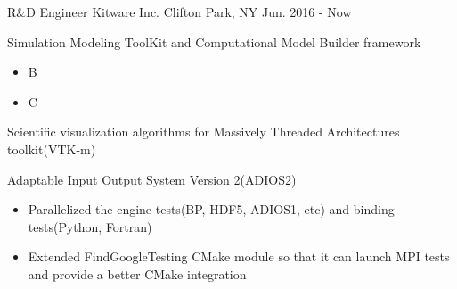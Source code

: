 

\begin{cventries}

  \cventry
    {R\&D Engineer} %
    {Kitware Inc.} %
    {Clifton Park, NY} %
    {Jun. 2016 - Now} %
    {
      \begin{cvitems} %
        \item {Simulation Modeling ToolKit and Computational Model Builder framework}
          \begin{itemize}
              \item {B}
              \item {C}
          \end{itemize}
        \item {Scientific visualization algorithms for Massively Threaded Architectures toolkit(VTK-m)}
        \item {Adaptable Input Output System Version 2(ADIOS2)}
        \begin{itemize}
            \item {Parallelized the engine tests(BP, HDF5, ADIOS1, etc) and binding tests(Python, Fortran)}
            \item {Extended FindGoogleTesting CMake module so that it can launch MPI tests and provide a better CMake integration}
        \end{itemize}
      \end{cvitems}
    }


\end{cventries}
